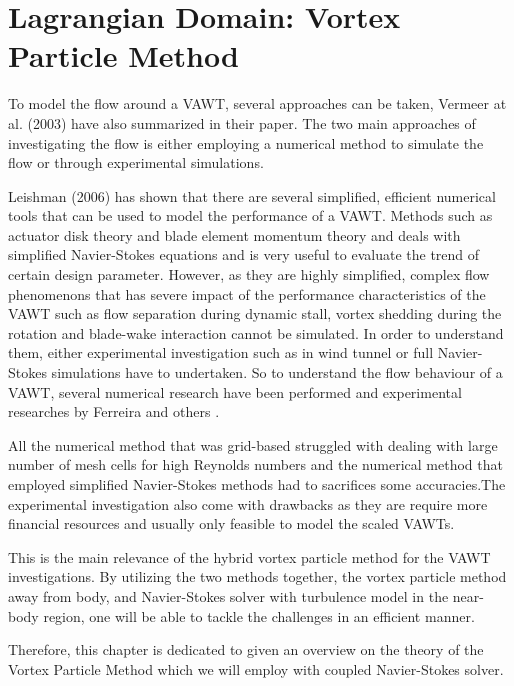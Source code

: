 \chapter{Lagrangian Domain: Vortex Particle Method}
\label{ch:theory}

To model the flow around a VAWT, several approaches can be taken, Vermeer at al. (2003) \cite{Vermeer2003} have also summarized in their paper. The two main approaches of investigating the flow is either employing a numerical method to simulate the flow or through experimental simulations.

Leishman (2006) \cite{leishman2006principles} has shown that there are several simplified, efficient numerical tools that can be used to model the performance of a VAWT. Methods such as actuator disk theory and blade element momentum theory and deals with simplified Navier-Stokes equations and is very useful to evaluate the trend of certain design parameter. However, as they are highly simplified, complex flow phenomenons that has severe impact of the performance characteristics of the VAWT such as flow separation during dynamic stall, vortex shedding during the rotation and blade-wake interaction cannot be simulated. In order to understand them, either experimental investigation such as in wind tunnel or full Navier-Stokes simulations have to undertaken. So to understand the flow behaviour of a VAWT, several numerical research have been performed \cite{Almohammadi2013} \cite{Ferreira2007} \cite{Islam2008} \cite{Merz2012} and experimental researches by Ferreira \cite{SimaoFerreira2008} \cite{Ferreira} and others \cite{Howell2010} \cite{Mertens2003}.

All the numerical method that was grid-based struggled with dealing with large number of mesh cells for high Reynolds numbers and the numerical method that employed simplified Navier-Stokes methods had to sacrifices some accuracies.The experimental investigation also come with drawbacks as they are require more financial resources and usually only feasible to model the scaled VAWTs.

This is the main relevance of the hybrid vortex particle method for the VAWT investigations. By utilizing the two methods together, the vortex particle method away from body, and Navier-Stokes solver with turbulence model in the near-body region, one will be able to tackle the challenges in an efficient manner.

Therefore, this chapter is dedicated to given an overview on the theory of the Vortex Particle Method which we will employ with coupled Navier-Stokes solver. 

